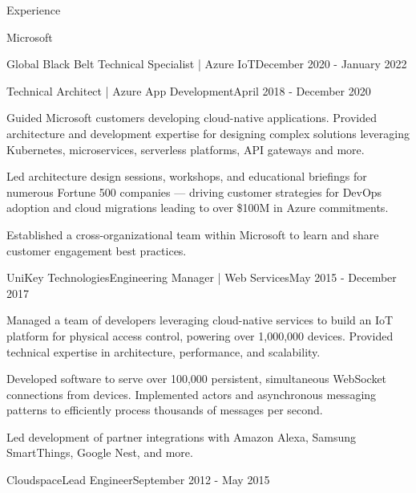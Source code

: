 \documentclass{resume} %
\begin{document}
\begin{rSection}{Experience}
\begin{rSubsection}{Microsoft}{}{}
\begin{rSubSubsection}{Global Black Belt Technical Specialist | Azure IoT}{December 2020 - January 2022}{}{}
    \end{rSubSubsection}


    \begin{rSubSubsection}{Technical Architect | Azure App Development}{April 2018 - December 2020}{}{}

        \item Guided Microsoft customers developing cloud-native applications.  Provided architecture and development expertise for designing complex solutions leveraging Kubernetes, microservices, serverless platforms, API gateways and more.
        \item Led architecture design sessions, workshops, and educational briefings for numerous Fortune 500 companies --- driving customer strategies for DevOps adoption and cloud migrations leading to over \$100M in Azure commitments.
        \item Established a cross-organizational team within Microsoft to learn and share customer engagement best practices.
        
    \end{rSubSubsection}
    
    
\end{rSubsection}


\begin{rSubsection}{UniKey Technologies}{Engineering Manager | Web Services}{May 2015 - December 2017}

\item Managed a team of developers leveraging cloud-native services to build an IoT platform for physical access control, powering over 1,000,000 devices.  Provided technical expertise in architecture, performance, and scalability.
\item Developed software to serve over 100,000 persistent, simultaneous WebSocket connections from devices. Implemented actors and asynchronous messaging patterns to efficiently process thousands of messages per second.
\item Led development of partner integrations with Amazon Alexa, Samsung SmartThings, Google Nest, and more.

\end{rSubsection}


\begin{rSubsection}{Cloudspace}{Lead Engineer}{September 2012 - May 2015}


\end{rSubsection}
\end{rSection}
\end{document}
